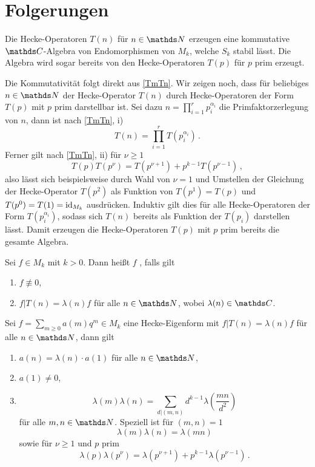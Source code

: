 \section{Folgerungen}

\begin{satz}
Die Hecke-Operatoren $T(n)$ für $n \in \NN$ erzeugen eine kommutative $\CC$-Algebra von Endomorphismen von $M_k$, welche $S_k$ stabil lässt. Die Algebra wird sogar bereits von den Hecke-Operatoren $T(p)$ für $p$ prim erzeugt.
\end{satz}

\begin{bewe}
Die Kommutativität folgt direkt aus \autoref{TmTn}. Wir zeigen noch, dass für beliebiges $n \in \NN$ der Hecke-Operator $T(n)$ durch Hecke-Operatoren der Form $T(p)$ mit $p$ prim darstellbar ist. Sei dazu $n = \prod_{i=1}^{r} p_i^{\alpha_i}$ die Primfaktorzerlegung von $n$, dann ist nach \autoref{TmTn}, i)
\[
T(n) = \prod_{i=1}^{r} T(p_i^{\alpha_i})
\,.
\]
Ferner gilt nach \autoref{TmTn}, ii) für $\nu \geq 1$
\[
T(p) T(p^\nu) = T(p^{\nu+1}) + p^{k-1} T(p^{\nu-1})
\,,
\]
also lässt sich beispielsweise durch Wahl von $\nu = 1$ und Umstellen der Gleichung der Hecke-Operator $T(p^2)$ als Funktion von $T(p^1) = T(p)$ und $T(p^0) = T(1) = \operatorname{id}_{M_k}$ ausdrücken. Induktiv gilt dies für alle Hecke-Operatoren der Form $T(p_i^{\alpha_i})$, sodass sich $T(n)$ bereits als Funktion der $T(p_i)$ darstellen lässt. Damit erzeugen die Hecke-Operatoren $T(p)$ mit $p$ prim bereits die gesamte Algebra.
\end{bewe}

\begin{defi}
Sei $f \in M_k$ mit $k > 0$. Dann heißt $f$ , falls gilt
\begin{enumerate}
\item $f \not \equiv 0$,
\item $f | T(n) = \lambda(n) f$ für alle $n \in \NN$, wobei $\lambda(n) \in \CC$.
\end{enumerate}
\end{defi}

\begin{satz}\label{EigenschaftenHeckeEigenformen}
Sei $f = \sum_{m \geq 0} a(m) q^m \in M_k$ eine Hecke-Eigenform mit $f | T(n) = \lambda(n) f$ für alle $n \in \NN$, dann gilt
\begin{enumerate}
\item $a(n) = \lambda(n) \cdot a(1)$ für alle $n \in \NN$,
\item $a(1) \neq 0$, 
\item \[
\lambda(m) \lambda(n) = \sum_{d \vert (m,n)} d^{k-1} \lambda \left( \frac {mn}{d^2} \right)
\]
für alle $m,n \in \NN$. Speziell ist für $(m, n) = 1$
\[
\lambda(m) \lambda(n) = \lambda(mn)
\]
sowie für $\nu \geq 1$ und $p$ prim
\[
\lambda(p) \lambda(p^\nu) = \lambda(p^{\nu+1}) + p^{k-1}\lambda(p^{\nu-1})
\,.
\]
\end{enumerate}
\end{satz}

